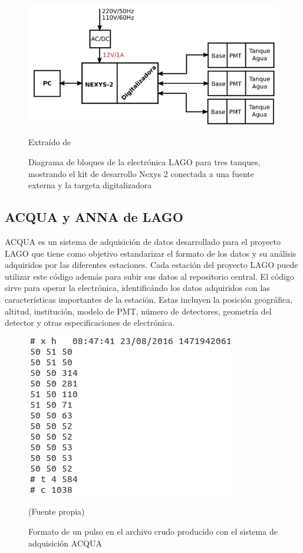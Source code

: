 \documentclass{book}
\begin{document}
\begin{figure}[h] %
\begin{center}
 \includegraphics[width =0.8\linewidth]{ElectronicaLAGO.png}
 
 Extra\'ido de \citep{SOFO}
\caption{Diagrama de bloques de la electr\'onica LAGO para tres tanques, mostrando el kit de desarrollo Nexys 2 conectada a una fuente externa y la targeta digitalizadora}
\end{center}
\end{figure}

\subsection{ACQUA y ANNA de LAGO}
ACQUA es un sistema de adquisici\'on de datos  desarrollado para el proyecto LAGO que tiene como objetivo estandarizar el formato de los datos y su an\'alisis adquiridos por las diferentes estaciones. Cada estaci\'on del proyecto LAGO puede utilizar este c\'odigo adem\'as para subir sus datos al repositorio central. El c\'odigo sirve para operar la electr\'onica, identific\'ando los datos adquiridos con las caracter\'isticas importantes de la estaci\'on. Estas incluyen la posici\'on geogr\'afica, altitud, instituci\'on, modelo de PMT, n\'umero de detectores, geometr\'ia del detector y otras especificaciones de electr\'onica.

\begin{figure}[h] %
\begin{center}
 \includegraphics[width =0.5\linewidth]{PulsoADC.png}
 
(Fuente propia)
\caption{Formato de un pulso en el archivo crudo producido con el sistema de adquisici\'on ACQUA}
\end{center}
\end{figure}
\end{document}
